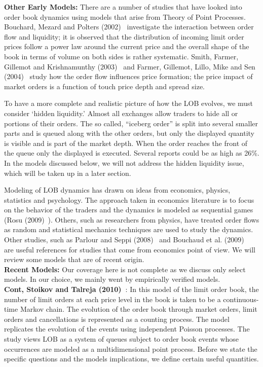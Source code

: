 \noindent \textbf{Other Early Models:} There are a number of studies that have looked into order book dynamics using models that arise from Theory of Point Processes. Bouchard, Mezard and Polters (2002)~\cite{bouchardmezard} investigate the interaction between order flow and liquidity; it is observed that the distribution of incoming limit order prices follow a power law around the current price and the overall shape of the book in terms of volume on both sides is rather systematic. Smith, Farmer, Gillemot and Krishnamunthy (2003)~\cite{smithfarm} and Farmer, Gillemot, Lillo, Mike and Sen (2004)~\cite{farmermikesen} study how the order flow influences price formation; the price impact of market orders is a function of touch price depth and spread size. 


To have a more complete and realistic picture of how the LOB evolves, we must consider `hidden liquidity.' Almost all exchanges allow traders to hide all or portions of their orders. The so called, ``iceberg order'' is split into several smaller parts and is queued along with the other orders, but only the displayed quantity is visible and is part of the market depth. When the order reaches the front of the queue only the displayed is executed. Several reports could be as high as 26\%. In the models discussed below, we will not address the hidden liquidity issue, which will be taken up in a later section.


Modeling of LOB dynamics has drawn on ideas from economics, physics, statistics and psychology. The approach taken in economics literature is to focus on the behavior of the traders and the dynamics is modeled as sequential games (Rosu (2009)~\cite{irosu09}). Others, such as researchers from physics, have treated order flows as random and statistical mechanics techniques are used to study the dynamics. Other studies, such as Parlour and Seppi (2008)~\cite{parseppi} and Bouchaud et al. (2009)~\cite{bouchaud2009} are useful references for studies that come from economics point of view. We will review some models that are of recent origin. \\



\noindent\textbf{Recent Models:} Our coverage here is not complete as we discuss only select models. In our choice, we mainly went by empirically verified models. \\


\noindent\textbf{Cont, Stoikov and Talreja (2010)~\cite{contstoi}}: In this model of the limit order book, the number of limit orders at each price level in the book is taken to be a continuous-time Markov chain. The evolution of the order book through market orders, limit orders and cancellations is represented as a counting process. The model replicates the evolution of the events using independent Poisson processes. The study views LOB as a system of queues subject to order book events whose occurrences are modeled as a multidimensional point process. Before we state the specific questions and the models implications, we define certain useful quantities. 


